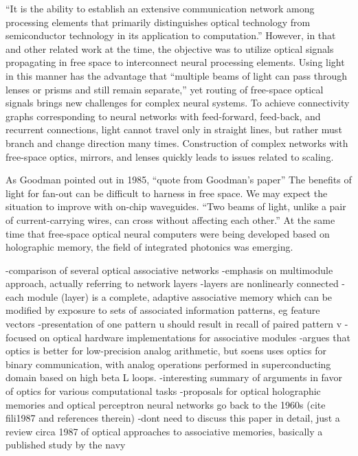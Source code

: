 \vspace{3em}
\cite{abps1987}
``It is the ability to establish an extensive communication network among processing elements that primarily distinguishes optical technology from semiconductor technology in its application to computation.'' \cite{abps1987} However, in that and other related work at the time, the objective was to utilize optical signals propagating in free space to interconnect neural processing elements. Using light in this manner has the advantage that ``multiple beams of light can pass through lenses or prisms and still remain separate,'' \cite{abps1987} yet routing of free-space optical signals brings new challenges for complex neural systems. To achieve connectivity graphs corresponding to neural networks with feed-forward, feed-back, and recurrent connections, light cannot travel only in straight lines, but rather must branch and change direction many times. Construction of complex networks with free-space optics, mirrors, and lenses quickly leads to issues related to scaling. 

As Goodman pointed out in 1985, ``quote from Goodman's paper'' The benefits of light for fan-out can be difficult to harness in free space. We may expect the situation to improve with on-chip waveguides. ``Two beams of light, unlike a pair of current-carrying wires, can cross without affecting each other.'' \cite{abps1987} At the same time that free-space optical neural computers were being developed based on holographic memory, the field of integrated photonics was emerging.

\cite{fili1987}
-comparison of several optical associative networks
-emphasis on multimodule approach, actually referring to network layers
-layers are nonlinearly connected
-each module (layer) is a complete, adaptive associative memory which can be modified by exposure to sets of associated information patterns, eg feature vectors
-presentation of one pattern u should result in recall of paired pattern v
-focused on optical hardware implementations for associative modules
-argues that optics is better for low-precision analog arithmetic, but soens uses optics for binary communication, with analog operations performed in superconducting domain based on high beta L loops.
-interesting summary of arguments in favor of optics for various computational tasks
-proposals for optical holographic memories and optical perceptron neural networks go back to the 1960s (cite fili1987 and references therein)
-dont need to discuss this paper in detail, just a review circa 1987 of optical approaches to associative memories, basically a published study by the navy

